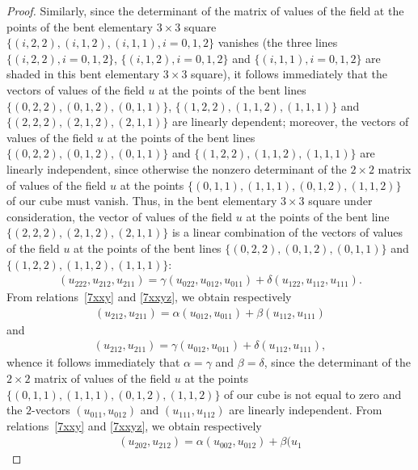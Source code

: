 \documentclass[11pt]{article}
\begin{document}
\begin{proof}
Similarly, since the determinant of the matrix of values of the
f\/ield at the points of the bent ele\-mentary $3 \times 3$ square
$\{(i, 2, 2), (i, 1, 2), (i, 1, 1), i = 0, 1, 2\}$ vanishes (the
three lines $\{(i, 2, 2), i = 0, 1, 2\}$, $\{(i, 1, 2), i = 0, 1,
2\}$ and $\{(i, 1, 1), i = 0, 1, 2\}$ are shaded in this bent
elementary $3 \times 3$ square), it follows immediately that the
vectors of values of the f\/ield $u$ at the points of the bent lines
$\{(0, 2, 2), (0, 1, 2), (0, 1, 1)\}$, $\{(1, 2, 2), (1, 1, 2), (1,
1, 1)\}$ and $\{(2, 2, 2), (2, 1, 2), (2, 1, 1)\}$ are linearly
dependent; moreover, the vectors of values of the f\/ield $u$ at the
points of the bent lines $\{(0, 2, 2), (0, 1, 2), (0, 1, 1)\}$ and
$\{(1, 2, 2), (1, 1, 2), (1, 1, 1)\}$ are linearly independent,
since otherwise the nonzero determinant of the $2 \times 2$ matrix
of values of the f\/ield $u$ at the points $\{(0, 1, 1), (1, 1, 1),
(0, 1, 2), (1, 1, 2)\}$ of our cube must vanish. Thus, in the bent
elementary $3 \times 3$ square under consideration, the vector of
values of the f\/ield $u$ at the points of the bent line $\{(2, 2, 2),
(2, 1, 2), (2, 1, 1)\}$ is a linear combination of the vectors of
values of the f\/ield $u$ at the points of the bent lines $\{(0, 2,
2), (0, 1, 2), (0, 1, 1)\}$ and $\{(1, 2, 2), (1, 1, 2), (1, 1,
1)\}$:
\begin{gather}
(u_{2 2 2}, u_{2 1 2}, u_{2 1 1}) = \gamma (u_{0 2 2},
u_{0 1 2}, u_{0 1 1}) + \delta (u_{1 2 2}, u_{1 1 2}, u_{1 1 1}).
\label{7xxyz}
\end{gather} From relations~\eqref{7xxy} and \eqref{7xxyz}, we
obtain respectively
\begin{gather*} (u_{2 1 2}, u_{2 1 1}) = \alpha (u_{0 1 2},
u_{0 1 1}) + \beta (u_{1 1 2}, u_{1 1 1}) %
\end{gather*} and
\begin{gather*}
(u_{2 1 2}, u_{2 1 1}) = \gamma (u_{0 1 2}, u_{0 1 1}) + \delta
(u_{1 1 2}, u_{1 1 1}), %
\end{gather*} whence it follows
immediately that $\alpha = \gamma$ and $\beta = \delta$, since the
determinant of the $2 \times 2$ matrix of values of the f\/ield $u$ at
the points $\{(0, 1, 1), (1, 1, 1), (0, 1, 2), (1, 1, 2)\}$ of our
cube is not equal to zero and the $2$-vectors $(u_{0 1 1}, u_{0 1
2})$ and $(u_{1 1 1}, u_{1 1 2})$ are linearly independent. From
relations~\eqref{7xxy} and \eqref{7xxyz}, we obtain respectively \begin{gather}
(u_{2 0 2}, u_{2 1 2}) = \alpha (u_{0 0 2}, u_{0 1 2}) + \beta (u_{1
}
\end{gather}
\end{proof}
\end{document}

